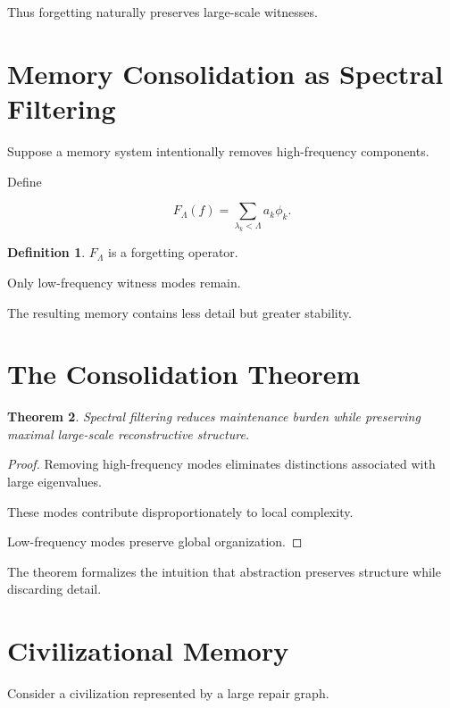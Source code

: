 \documentclass[12pt,oneside]{book}
\theoremstyle{plain} \newtheorem{theorem}{Theorem}[chapter] \newtheorem{lemma}[theorem]{Lemma} \newtheorem{proposition}[theorem]{Proposition} \newtheorem{corollary}[theorem]{Corollary}
\theoremstyle{definition} \newtheorem{definition}[theorem]{Definition} \newtheorem{axiom}[theorem]{Axiom} \newtheorem{construction}[theorem]{Construction}
\theoremstyle{remark} \newtheorem{remark}[theorem]{Remark} \newtheorem{example}[theorem]{Example}
\begin{document}
Thus forgetting naturally preserves large-scale witnesses.

\section{Memory Consolidation as Spectral Filtering}

Suppose a memory system intentionally removes high-frequency components.

Define

\[
F_\Lambda(f)
=
\sum_{\lambda_k<\Lambda}
a_k
\phi_k.
\]

\begin{definition}

$F_\Lambda$ is a forgetting operator.

\end{definition}

Only low-frequency witness modes remain.

The resulting memory contains less detail but greater stability.

\section{The Consolidation Theorem}

\begin{theorem}

Spectral filtering reduces maintenance burden while preserving maximal large-scale reconstructive structure.

\end{theorem}

\begin{proof}

Removing high-frequency modes eliminates distinctions associated with large eigenvalues.

These modes contribute disproportionately to local complexity.

Low-frequency modes preserve global organization.

\end{proof}

The theorem formalizes the intuition that abstraction preserves structure while discarding detail.

\section{Civilizational Memory}

Consider a civilization represented by a large repair graph.
\end{document}
